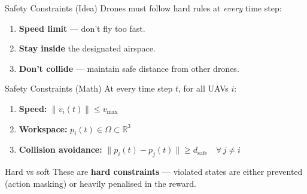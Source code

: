 \documentclass[aspectratio=169,12pt]{beamer}
\begin{document}
\begin{frame}{Safety Constraints (Idea)}
Drones must follow hard rules at \emph{every} time step:

\begin{enumerate}
    \item \textbf{Speed limit} --- don't fly too fast.
    \item \textbf{Stay inside} the designated airspace.
    \item \textbf{Don't collide} --- maintain safe distance from other drones.
\end{enumerate}

\vspace{0.5em}
\begin{center}
\end{center}
\end{frame}

\begin{frame}{Safety Constraints (Math)}
At every time step $t$, for all UAVs $i$:

\vspace{0.3em}
\begin{enumerate}
    \item \textbf{Speed:}
    $\|v_i(t)\| \le v_{\max}$
    \item \textbf{Workspace:}
    $p_i(t) \in \Omega \subset \mathbb{R}^3$
    \item \textbf{Collision avoidance:}
    $\|p_i(t) - p_j(t)\| \ge d_{\text{safe}}
    \quad \forall\, j \ne i$
\end{enumerate}

\vspace{0.6em}
\begin{block}{Hard vs soft}
These are \textbf{hard constraints} --- violated states are either
prevented (action masking) or heavily penalised in the reward.
\end{block}
\end{frame}
\end{document}
